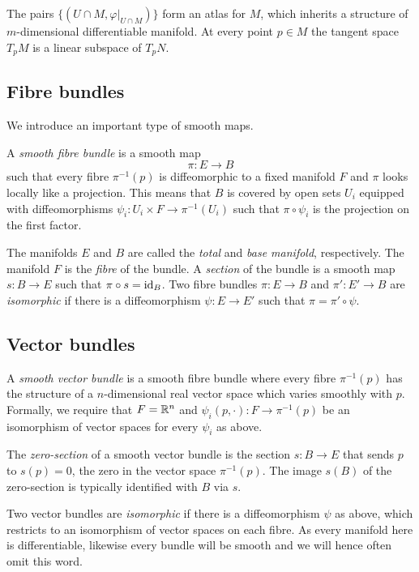 The pairs $\{(U\cap M, \varphi|_{U\cap M})\}$ form an atlas for $M$, which inherits a structure of $m$-dimensional differentiable manifold. At every point $p\in M$ the tangent space $T_p M$ is a linear subspace of $T_p N$. 

\subsection{Fibre bundles}
We introduce an important type of smooth maps. 
\begin{defn}
A \emph{smooth fibre bundle} is a smooth map
$$\pi\colon E \longrightarrow B$$
such that every fibre $\pi^{-1}(p)$ is diffeomorphic to a fixed manifold $F$ and $\pi$ looks locally like a projection. This means that $B$ is covered by open sets $U_i$ equipped with diffeomorphisms $\psi_i \colon U_i\times F \to \pi^{-1}(U_i) $ such that $\pi\circ\psi_i$ is the projection on the first factor.
\end{defn}

The manifolds $E$ and $B$ are called the \emph{total} and \emph{base manifold}, respectively. The manifold $F$ is the \emph{fibre} of the bundle. A \emph{section} of the bundle is a smooth map $s\colon B\to E$ such that $\pi\circ s = {\rm id}_B$. Two fibre bundles $\pi\colon E \to B$ and $\pi'\colon E' \to B$ are \emph{isomorphic} if there is a diffeomorphism $\psi\colon E \to E'$ such that $\pi = \pi'\circ\psi$.

\subsection{Vector bundles}
A \emph{smooth vector bundle} is a smooth fibre bundle where every fibre $\pi^{-1}(p)$ has the structure of a $n$-dimensional real vector space which varies smoothly with $p$. Formally, we require that $F=\mathbb{R}^n$ and $\psi_i (p,\cdot)\colon F \to \pi^{-1}(p) $ be an isomorphism of vector spaces for every $\psi_i$ as above.

The \emph{zero-section} of a smooth vector bundle is the section $s\colon B \to E$ that sends $p$ to $s(p)=0$, the zero in the vector space $\pi^{-1}(p)$. The image $s(B)$ of the zero-section is typically identified with $B$ via $s$.

Two vector bundles are \emph{isomorphic} if there is a diffeomorphism $\psi$ as above, which restricts to an isomorphism of vector spaces on each fibre.
As every manifold here is differentiable, likewise every bundle will be smooth and we will hence often omit this word.

